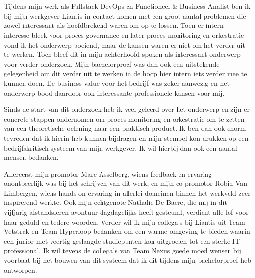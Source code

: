 
\chapter*{}%
\label{ch:voorwoord}

Tijdens mijn werk als Fullstack DevOps en Functioneel & Business Analist ben ik bij mijn werkgever Liantis in contact komen met een groot aantal problemen die zowel interessant als hoofdbrekend waren om op te lossen. Toen er intern interesse bleek voor proces governance en later proces monitoring en orkestratie vond ik het onderwerp boeiend, maar de kansen waren er niet om het verder uit te werken. Toch bleef dit in mijn achterhoofd spoken als interessant onderwerp voor verder onderzoek. Mijn bachelorproef was dan ook een uitstekende gelegenheid om dit verder uit te werken in de hoop hier intern iets verder mee te kunnen doen. De business value voor het bedrijf was zeker aanwezig en het onderwerp bood daardoor ook interessante professionele kansen voor mij.\newline

Sinds de start van dit onderzoek heb ik veel geleerd over het onderwerp en zijn er concrete stappen ondernomen om proces monitoring en orkestratie om te zetten van een theoretische oefening naar een praktisch product. Ik ben dan ook enorm tevreden dat ik hierin heb kunnen bijdragen en mijn stempel kon drukken op een bedrijfskritisch systeem van mijn werkgever. Ik wil hierbij dan ook een aantal mensen bedanken. \newline

Allereerst mijn promotor Marc Asselberg, wiens feedback en ervaring onontbeerlijk was bij het schrijven van dit werk, en mijn co-promotor Robin Van Limbergen, wiens hands-on ervaring in allerlei domeinen binnen het werkveld zeer inspirerend werkte. Ook mijn echtgenote Nathalie De Baere, die mij in dit vijfjarig afstandsleren avontuur dagdagelijks heeft gesteund, verdient alle lof voor haar geduld en tedere woorden. Verder wil ik mijn collega's bij Liantis uit Team Vetstrak en Team Hyperloop bedanken om een warme omgeving te bieden waarin een junior met veertig geslaagde studiepunten kon uitgroeien tot een sterke IT-professional. Ik wil tevens de collega's van Team Nexus goede moed wensen bij voorbaat bij het bouwen van dit systeem dat ik dit tijdens mijn bachelorproef heb ontworpen.    